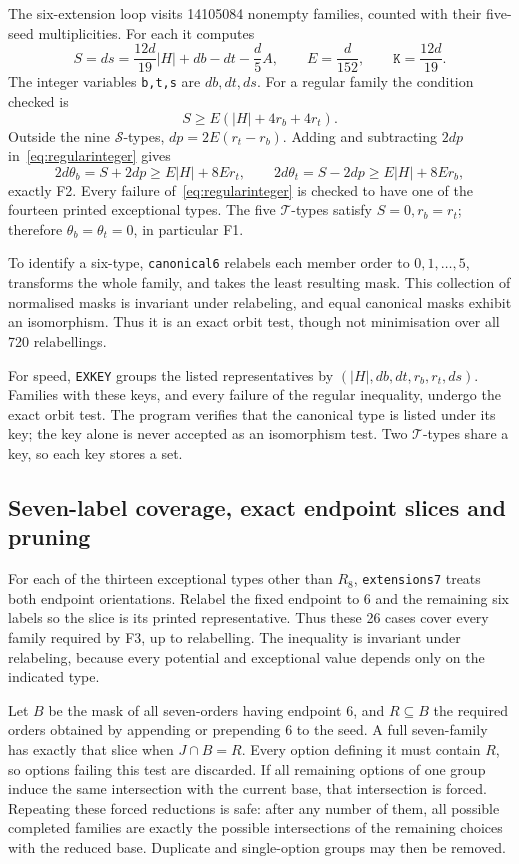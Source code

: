 \documentclass[11pt,letterpaper]{article}
\theoremstyle{definition}
\begin{document}
The six-extension loop visits 14105084 nonempty families, counted with
their five-seed multiplicities. For each it computes
\[
 S=ds=\frac{12d}{19}|H|+db-dt-\frac d5A,
 \qquad E=\frac d{152},\qquad \texttt{K}=\frac{12d}{19}.
\]
The integer variables \texttt{b,t,s} are \(db,dt,ds\).
For a regular family the condition checked is
\begin{equation}\label{eq:regularinteger}
 S\geq E(|H|+4r_b+4r_t).
\end{equation}
Outside the nine \(\mathcal S\)-types, \(dp=2E(r_t-r_b)\).
Adding and subtracting \(2dp\) in~\eqref{eq:regularinteger} gives
\[
 2d\theta_b=S+2dp\geq E|H|+8Er_t,\qquad
 2d\theta_t=S-2dp\geq E|H|+8Er_b,
\]
exactly F2. Every failure of~\eqref{eq:regularinteger} is checked
to have one of the fourteen printed exceptional types. The five
\(\mathcal T\)-types satisfy \(S=0,r_b=r_t\); therefore
\(\theta_b=\theta_t=0\), in particular F1.

To identify a six-type, \texttt{canonical6} relabels each member order
to \(0,1,\ldots,5\), transforms the whole family, and takes the least
resulting mask. This collection of normalised masks is invariant under
relabeling, and equal canonical masks exhibit an isomorphism. Thus it
is an exact orbit test, though not minimisation over all 720 relabellings.

For speed, \texttt{EXKEY} groups the listed representatives by
\((|H|,db,dt,r_b,r_t,ds)\). Families with these keys, and every failure
of the regular inequality, undergo the exact orbit test. The program
verifies that the canonical type is listed under its key; the key alone
is never accepted as an isomorphism test. Two \(\mathcal T\)-types
share a key, so each key stores a set.

\subsection{Seven-label coverage, exact endpoint slices and pruning}
For each of the thirteen exceptional types other than \(R_8\),
\texttt{extensions7} treats both endpoint orientations. Relabel the
fixed endpoint to 6 and the remaining six labels so the slice is its
printed representative. Thus these 26 cases cover every family
required by F3, up to relabelling. The inequality is invariant under
relabeling, because every potential and exceptional value depends
only on the indicated type.

Let \(B\) be the mask of all seven-orders having endpoint 6, and
\(R\subseteq B\) the required orders obtained by appending or
prepending 6 to the seed. A full seven-family has exactly that slice
when \(J\cap B=R\). Every option defining it must contain \(R\),
so options failing this test are discarded. If all remaining options
of one group induce the same intersection with the current base,
that intersection is forced. Repeating these forced reductions is
safe: after any number of them, all possible completed families are
exactly the possible intersections of the remaining choices with the
reduced base. Duplicate and single-option groups may then be removed.
\end{document}
